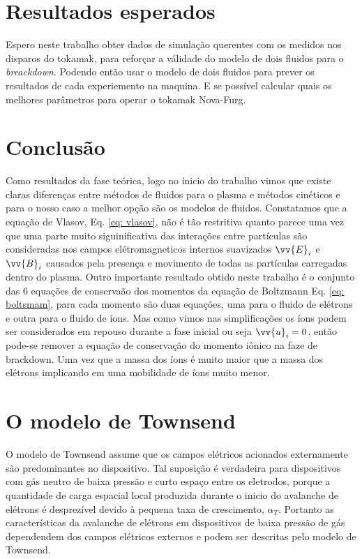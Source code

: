 \documentclass[12pt,oneside,a4paper]{abntex2}
\theoremstyle{definition}  %
\begin{document}
\chapter{Resultados esperados}
Espero neste trabalho obter dados de simulação querentes com os medidos nos disparos do tokamak, para reforçar a válidade do modelo de dois fluidos para o \textit{breackdown}. Podendo então usar o modelo de dois fluidos para prever os resultados de cada experiemento na maquina. E se possível calcular quais os melhores parâmetros para operar o tokamak Nova-Furg.

\chapter{Conclusão}
Como resultados da fase teórica, logo no ínicio do trabalho vimos que existe claras diferenças entre métodos de fluidos para o plasma e métodos cinéticos e para o nosso caso a melhor opção são os modelos de fluidos. Constatamos que a equação de Vlasov, Eq. \ref{eq: vlasov}, não é tão restritiva quanto parece uma vez que uma parte muito siguinificativa das interações entre partículas são consideradas nos campos elétromagneticos  internos suavizados $\vv{E}_i$ e $\vv{B}_i$ causados pela presença e movimento de todas as partículas carregadas dentro do plasma. Outro importante resultado obtido neste trabalho é o conjunto das 6 equações de conservaão dos momentos da equação de Boltzmann Eq. \ref{eq: boltsmam}, para cada momento são duas equações, uma para o fluido de elétrons e outra para o fluido de íons. Mas como vimos nas simplificações os íons podem ser considerados em repouso durante a fase inicial ou seja $\vv{u}_i = 0$, então pode-se remover a equação de conservação do momento iônico na faze de brackdown. Uma vez que a massa dos íons é muito maior que a massa dos elétrons implicando em uma mobilidade de íons muito menor. 
\appendix  
\chapter{O modelo de Townsend}
\label{Townsend}
O modelo de Townsend assume que os campos elétricos acionados externamente são predominantes no dispositivo. Tal suposição é verdadeira para dispositivos com gás neutro de baixa pressão e curto espaço entre os eletrodos, porque a quantidade de carga espacial local produzida durante o inicio do avalanche de elétrons é desprezível devido à pequena taxa de crescimento, $\alpha_T$. Portanto as características da avalanche de elétrons em dispositivos de baixa pressão de gás dependendem dos campos elétricos externos e podem ser descritas pelo modelo de Townsend. 
\end{document}
